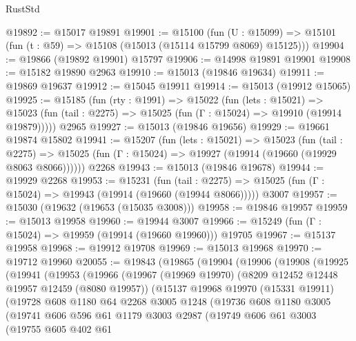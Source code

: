 \begin{lexlean}{RustStd}
\begin{coremodule}
@19892 := @15017 @19891
@19901 := @15100
    (fun (U : @15099) => @15101 (fun (t : @59) => @15108 (@15013 (@15114 @15799 @8069) @15125)))
@19904 := @19866 (@19892 @19901) @15797
@19906 := @14998 @19891 @19901
@19908 := @15182 @19890 @2963
@19910 := @15013 (@19846 @19634)
@19911 := @19869 @19637
@19912 := @15045 @19911
@19914 := @15013 (@19912 @15065)
@19925 := @15185
    (fun (rty : @1991) =>
    @15022
      (fun (lets : @15021) =>
      @15023 (fun (tail : @2275) => @15025 (fun (Γ : @15024) => @19910 (@19914 @19879)))))
    @2965
@19927 := @15013 (@19846 @19656)
@19929 := @19661 @19874 @15802
@19941 := @15207
    (fun (lets : @15021) =>
    @15023
      (fun (tail : @2275) =>
      @15025 (fun (Γ : @15024) => @19927 (@19914 (@19660 (@19929 @8063 @8066))))))
    @2268
@19943 := @15013 (@19846 @19678)
@19944 := @19929 @2268
@19953 := @15231
    (fun (tail : @2275) => @15025 (fun (Γ : @15024) => @19943 (@19914 (@19660 (@19944 @8066)))))
    @3007
@19957 := @15030 (@19632 (@19653 (@15035 @3008)))
@19958 := @19846 @19957
@19959 := @15013 @19958
@19960 := @19944 @3007
@19966 := @15249 (fun (Γ : @15024) => @19959 (@19914 (@19660 @19960))) @19705
@19967 := @15137 @19958
@19968 := @19912 @19708
@19969 := @15013 @19968
@19970 := @19712 @19960
@20055 := @19843
    (@19865
      (@19904
        (@19906
          (@19908
            (@19925
              (@19941
                (@19953
                  (@19966
                    (@19967
                      (@19969 @19970)
                      (@8209 @12452 @12448 @19957 @12459 (@8080 @19957))
                      (@15137
                        @19968
                        @19970
                        (@15331 @19911)
                        (@19728
                          @608
                          @1180
                          @64
                          @2268
                          @3005
                          @1248
                          (@19736
                            @608
                            @1180
                            @3005
                            (@19741
                              @606
                              @596
                              @61
                              @1179
                              @3003
                              @2987
                              (@19749
                                @606
                                @61
                                @3003
                                (@19755
                                  @605
                                  @402
                                  @61

\end{coremodule}
\end{lexlean}
